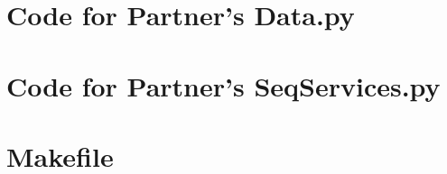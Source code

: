 \documentclass[12pt]{article}
\begin{document}
\noindent 

\newpage

\section{Code for Partner's Data.py}

\noindent 

\newpage

\section{Code for Partner's SeqServices.py}

\noindent 

\newpage

\section{Makefile}

\lstset{language=make}
\noindent 
\end{document}
